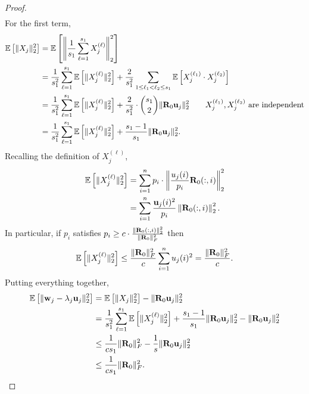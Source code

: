 \documentclass{article}
\begin{document}
\begin{proof}
\begin{align*}
    \end{align*}
    For the first term,
    \begin{align*}
         \mathbb{E}\left[\|X_j\|^2_2\right] &= \mathbb{E}\left[\left\|\frac{1}{s_1}\sum_{\ell = 1}^{s_1} X_j^{(\ell)}\right\|^2_2\right]\\
         &= \frac{1}{s_1^2}\sum_{\ell = 1}^{s_1}\mathbb{E}\left[\|X_j^{(\ell)}\|^2_2\right] + \frac{2}{s_1^2}\sum_{1\leq \ell_1 < \ell_2\leq s_1}\mathbb{E}\left[X_j^{(\ell_1)}\cdot X_j^{(\ell_2)}\right]\\
         &= \frac{1}{s_1^2}\sum_{\ell = 1}^{s_1}\mathbb{E}\left[\|X_j^{(\ell)}\|^2_2\right] + \frac{2}{s_1^2}\cdot \binom{s_1}{2}\|\mathbf{R}_0\mathbf{u}_j\|^2_2\qquad\text{$X_j^{(\ell_1)}, X_j^{(\ell_2)}$ are independent}\\
         &= \frac{1}{s_1^2}\sum_{\ell = 1}^{s_1}\mathbb{E}\left[\|X_j^{(\ell)}\|^2_2\right] + \frac{s_1-1}{s_1}\|\mathbf{R}_0\mathbf{u}_j\|^2_2.\\
    \end{align*}
    Recalling the definition of $X_j^{(\ell)}$, 
    \begin{align*}
        \mathbb{E}\left[\|X_j^{(\ell)}\|^2_2\right] &= \sum_{i = 1}^n p_i\cdot  \left\|\frac{u_j(i)}{p_i}\mathbf{R}_0(:, i)\right\|^2_2\\
        &=\sum_{i = 1}^n\frac{\mathbf{u}_j(i)^2}{p_i}\left\|\mathbf{R}_0(:, i)\right\|^2_2.
    \end{align*}
    In particular, if $p_i$ satisfies $p_i\geq c\cdot \frac{\|\mathbf{R}_0(:,i)\|^2_2}{\|\mathbf{R}_0\|^2_F}$ then 
    \[\mathbb{E}\left[\|X_j^{(\ell)}\|^2_2\right] \leq \frac{\|\mathbf{R}_0\|^2_F}{c}\sum_{i = 1}^nu_j(i)^2 = \frac{\|\mathbf{R}_0\|^2_F}{c}.\]
    Putting everything together, 
    \begin{align*}
        \mathbb{E}\left[\|\mathbf{w}_j - \lambda_j\mathbf{u}_j\|^2_2\right] &= \mathbb{E}\left[\|X_j\|^2_2\right] -  \|\mathbf{R}_0\mathbf{u}_j\|^2_2\\
        &= \frac{1}{s_1^2}\sum_{\ell = 1}^{s_1}\mathbb{E}\left[\|X_j^{(\ell)}\|^2_2\right] + \frac{s_1-1}{s_1}\|\mathbf{R}_0\mathbf{u}_j\|^2_2 - \|\mathbf{R}_0\mathbf{u}_j\|^2_2\\
        &\leq \frac{1}{cs_1}{\|\mathbf{R}_0\|^2_F} - \frac{1}{s}\|\mathbf{R}_0\mathbf{u}_j\|^2_2\\
        &\leq \frac{1}{cs_1}{\|\mathbf{R}_0\|^2_F}.
    \end{align*}


\end{proof}
\end{document}
